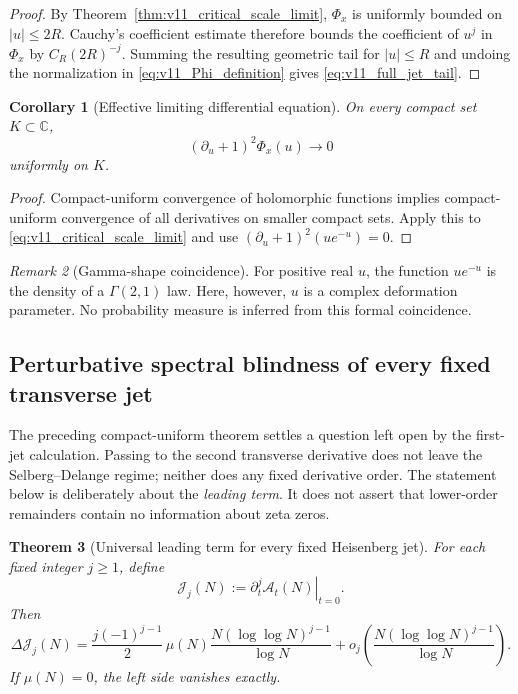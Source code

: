 \documentclass[11pt]{amsart}
\numberwithin{equation}{section}
\theoremstyle{plain}
\newtheorem{theorem}{Theorem}[section]
\newtheorem{corollary}[theorem]{Corollary}
\theoremstyle{definition}
\theoremstyle{remark}
\newtheorem{remark}[theorem]{Remark}
\begin{document}
\begin{proof}
By Theorem~\ref{thm:v11_critical_scale_limit}, \(\Phi_x\) is uniformly
bounded on \(|u|\le2R\).  Cauchy's coefficient estimate therefore bounds
the coefficient of \(u^j\) in \(\Phi_x\) by \(C_R(2R)^{-j}\).  Summing the
resulting geometric tail for \(|u|\le R\) and undoing the normalization in
\eqref{eq:v11_Phi_definition} gives \eqref{eq:v11_full_jet_tail}.
\end{proof}

\begin{corollary}[Effective limiting differential equation]
\label{cor:v11_effective_ODE}
On every compact set \(K\subset\mathbb C\),
\begin{equation}
(\partial_u+1)^2\Phi_x(u)\longrightarrow0
\label{eq:v11_effective_ODE}
\end{equation}
uniformly on \(K\).
\end{corollary}

\begin{proof}
Compact-uniform convergence of holomorphic functions implies
compact-uniform convergence of all derivatives on smaller compact sets.
Apply this to \eqref{eq:v11_critical_scale_limit} and use
\((\partial_u+1)^2(ue^{-u})=0\).
\end{proof}

\begin{remark}[Gamma-shape coincidence]
\label{rem:v11_gamma_caution}
For positive real \(u\), the function \(ue^{-u}\) is the density of a
\(\Gamma(2,1)\) law.  Here, however, \(u\) is a complex deformation
parameter.  No probability measure is inferred from this formal coincidence.
\end{remark}


\subsection{Perturbative spectral blindness of every fixed transverse jet}
\label{subsec:v12_fixed_jet_blindness}

The preceding compact-uniform theorem settles a question left open by the
first-jet calculation.  Passing to the second transverse derivative does not
leave the Selberg--Delange regime; neither does any fixed derivative order.
The statement below is deliberately about the \emph{leading term}.  It does
not assert that lower-order remainders contain no information about zeta
zeros.

\begin{theorem}[Universal leading term for every fixed Heisenberg jet]
\label{thm:v12_all_fixed_jets}
For each fixed integer \(j\ge1\), define
\begin{equation}
\mathcal J_j(N):=
\left.\partial_t^j\mathcal A_t(N)\right|_{t=0}.
\label{eq:v12_Jj_definition}
\end{equation}
Then
\begin{equation}
\boxed{
\Delta\mathcal J_j(N)
=
\frac{j(-1)^{j-1}}{2}\,\mu(N)
\frac{N(\log\log N)^{j-1}}{\log N}
+o_j\!\left(
\frac{N(\log\log N)^{j-1}}{\log N}
\right).}
\label{eq:v12_all_fixed_jets}
\end{equation}
If \(\mu(N)=0\), the left side vanishes exactly.
\end{theorem}
\end{document}
